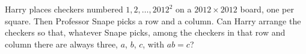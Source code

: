 Harry places checkers numbered $1,2,\dots,2012^2$ on a $2012\times2012$ board, one per square. Then Professor Snape picks a row and a column. Can Harry arrange the checkers so that, whatever Snape picks, among the checkers in that row and column there are always three, $a$, $b$, $c$, with $ab=c$?
